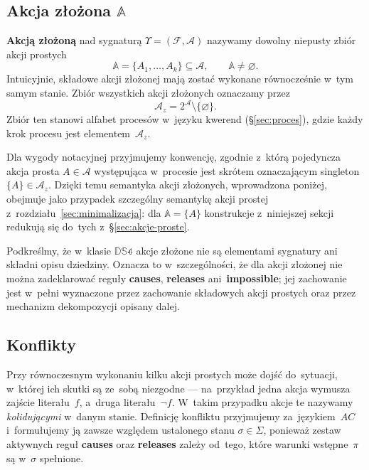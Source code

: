 \documentclass[11pt,a4paper]{article}
\newif\ifshowbib
\newcommand{\bibonly}[1]{\ifshowbib#1\fi}
\renewcommand{\cite}[2][]{\unskip}%
\newcommand{\causes}{\textbf{causes}}
\newcommand{\impossible}{\textbf{impossible}}
\newcommand{\releases}{\textbf{releases}}
\theoremstyle{definition}
\begin{document}
\subsection{Akcja złożona \texorpdfstring{$\mathbb{A}$}{A}}
\label{sec:akcja-zlozona}

\textbf{Akcją złożoną} nad sygnaturą $\Upsilon=(\mathcal{F},\mathcal{A})$
nazywamy dowolny niepusty zbiór akcji prostych
\[
  \mathbb{A} = \{A_1, \ldots, A_k\} \subseteq \mathcal{A},
  \qquad \mathbb{A} \neq \varnothing.
\]
Intuicyjnie, składowe akcji złożonej mają zostać wykonane równocześnie
w~tym samym stanie. Zbiór wszystkich akcji złożonych oznaczamy przez
\[
  \mathcal{A}_z = 2^{\mathcal{A}} \setminus \{\varnothing\}.
\]
Zbiór ten stanowi alfabet procesów w~języku kwerend (§\ref{sec:proces}),
gdzie każdy krok procesu jest elementem~$\mathcal{A}_z$.

Dla wygody notacyjnej przyjmujemy konwencję, zgodnie z~którą pojedyncza
akcja prosta $A \in \mathcal{A}$ występująca w~procesie jest skrótem
oznaczającym singleton $\{A\} \in \mathcal{A}_z$. Dzięki temu semantyka
akcji złożonych, wprowadzona poniżej, obejmuje jako przypadek szczególny
semantykę akcji prostej z~rozdziału~\ref{sec:minimalizacja}: dla
$\mathbb{A} = \{A\}$ konstrukcje z~niniejszej sekcji redukują się do~tych
z~§\ref{sec:akcje-proste}.

Podkreślmy, że w~klasie $\mathbb{DS4}$ akcje złożone nie są elementami
sygnatury ani składni opisu dziedziny. Oznacza to w~szczególności, że
dla akcji złożonej nie można zadeklarować reguły \causes{}, \releases{}
ani~\impossible{}; jej zachowanie jest w~pełni wyznaczone przez
zachowanie składowych akcji prostych oraz przez mechanizm dekompozycji
opisany dalej.

\subsection{Konflikty}
\label{sec:konflikty}

Przy równoczesnym wykonaniu kilku akcji prostych może dojść do~sytuacji,
w~której ich skutki są ze~sobą niezgodne --- na~przykład jedna akcja
wymusza zajście literału~$f$, a~druga literału~$\neg f$. W~takim
przypadku akcje te nazywamy \emph{kolidującymi} w~danym stanie.
Definicję konfliktu przyjmujemy za~językiem~$AC$\bibonly{~\cite{rw05}}
i~formułujemy ją zawsze względem ustalonego stanu $\sigma \in \Sigma$,
ponieważ zestaw aktywnych reguł \causes{} oraz \releases{} zależy od~tego,
które warunki wstępne~$\pi$ są w~$\sigma$ spełnione.
\end{document}
